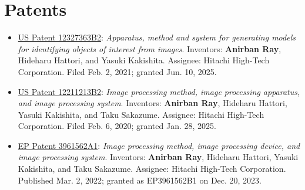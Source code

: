 \documentclass[11pt,a4paper]{article}
\begin{document}
\section*{Patents}
\begin{itemize}
  \item \href{https://patents.google.com/patent/US12327363B2}{US Patent 12327363B2}: \textit{Apparatus, method and system for generating models for identifying objects of interest from images}. Inventors: \textbf{Anirban Ray}, Hideharu Hattori, and Yasuki Kakishita. Assignee: Hitachi High-Tech Corporation. Filed Feb. 2, 2021; granted Jun. 10, 2025.
  \item \href{https://patents.google.com/patent/US12211213B2}{US Patent 12211213B2}: \textit{Image processing method, image processing apparatus, and image processing system}. Inventors: \textbf{Anirban Ray}, Hideharu Hattori, Yasuki Kakishita, and Taku Sakazume. Assignee: Hitachi High-Tech Corporation. Filed Feb. 6, 2020; granted Jan. 28, 2025.
  \item \href{https://patents.google.com/patent/EP3961562A1}{EP Patent 3961562A1}: \textit{Image processing method, image processing device, and image processing system}. Inventors: \textbf{Anirban Ray}, Hideharu Hattori, Yasuki Kakishita, and Taku Sakazume. Assignee: Hitachi High-Tech Corporation. Published Mar. 2, 2022; granted as EP3961562B1 on Dec. 20, 2023.
\end{itemize}
\end{document}
